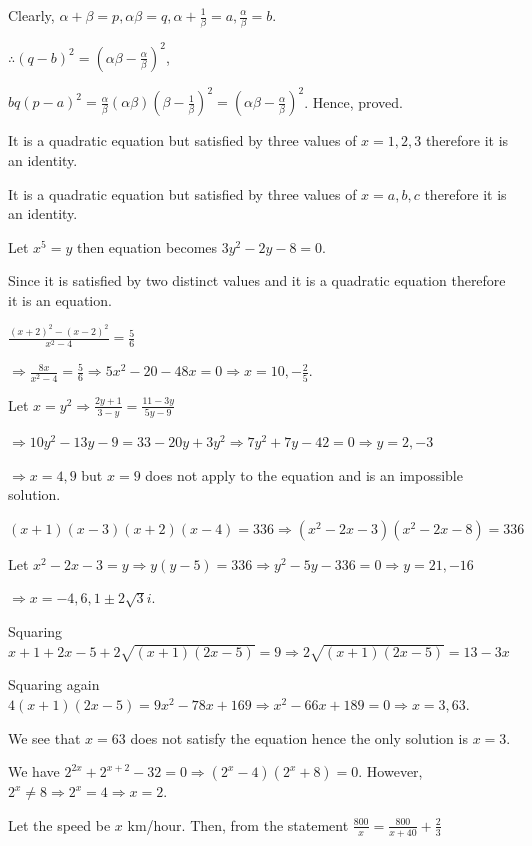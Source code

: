   Clearly, $\alpha + \beta = p, \alpha\beta = q, \alpha + \frac{1}{\beta} = a, \frac{\alpha}{\beta} = b$.

  $\therefore (q - b)^2 = (\alpha\beta - \frac{\alpha}{\beta})^2$,

  $bq(p - a)^2 = \frac{\alpha}{\beta}(\alpha\beta)(\beta - \frac{1}{\beta})^2 = (\alpha\beta -
  \frac{\alpha}{\beta})^2$. Hence, proved.
\item It is a quadratic equation but satisfied by three values of $x = 1, 2, 3$ therefore it is an
  identity.
\item It is a quadratic equation but satisfied by three values of $x = a, b, c$ therefore it is an
  identity.
\item Let $x^5 = y$ then equation becomes $3y^2 - 2y - 8 = 0$.

  Since it is satisfied by two distinct values and it is a quadratic equation therefore it is an
  equation.
\item $\frac{(x + 2)^2 - (x - 2)^2}{x^2 - 4} = \frac{5}{6}$

  $\Rightarrow \frac{8x}{x^2 - 4} = \frac{5}{6}\Rightarrow 5x^2 - 20 - 48x = 0\Rightarrow x = 10 ,
  -\frac{2}{5}$.
\item Let $x = y^2\Rightarrow \frac{2y + 1}{3 - y} = \frac{11 - 3y}{5y - 9}$

  $\Rightarrow 10y^2 - 13y - 9 = 33 - 20y + 3y^2\Rightarrow 7y^2 + 7y - 42 = 0\Rightarrow y = 2, -3$

  $\Rightarrow x = 4, 9$ but $x = 9$ does not apply to the equation and is an impossible solution.
\item $(x + 1)(x - 3)(x + 2)(x - 4) = 336\Rightarrow (x^2 - 2x - 3)(x^2 - 2x - 8) = 336$

  Let $x^2 - 2x - 3 = y\Rightarrow y(y - 5) = 336\Rightarrow y^2 - 5y - 336 = 0\Rightarrow y = 21, -16$

  $\Rightarrow x = -4, 6, 1 \pm 2\sqrt{3}i$.
\item Squaring $x + 1 + 2x - 5 + 2\sqrt{(x + 1)(2x - 5)} = 9 \Rightarrow 2\sqrt{(x + 1)(2x - 5)} = 13 - 3x$

  Squaring again $4(x + 1)(2x - 5) = 9x^2 - 78x + 169 \Rightarrow x^2 - 66x + 189 = 0\Rightarrow x = 3, 63$.

  We see that $x = 63$ does not satisfy the equation hence the only solution is $x = 3$.
\item We have $2^{2x} + 2^{x + 2} - 32 = 0\Rightarrow (2^x - 4)(2^x + 8) = 0$. However, $2^x \neq
  8\Rightarrow 2^x = 4 \Rightarrow x = 2$.
\item Let the speed be $x$ km/hour. Then, from the statement $\frac{800}{x} = \frac{800}{x + 40} + \frac{2}{3}$

